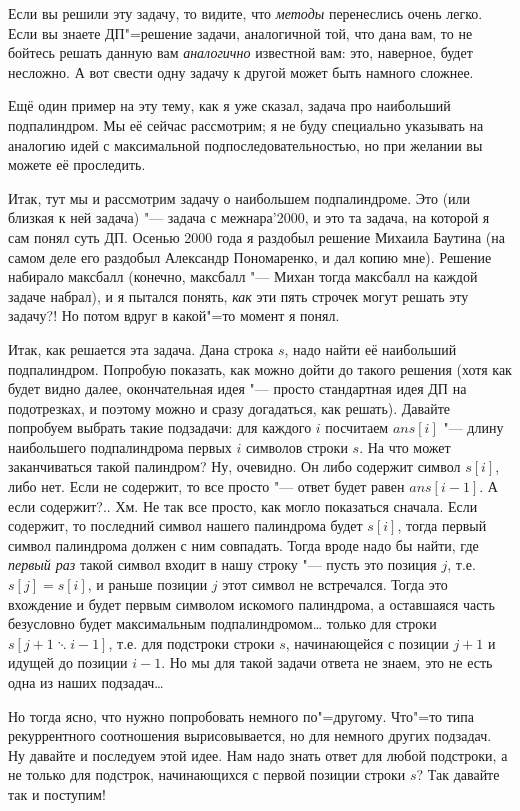 Если вы решили эту задачу, то видите, что \textit{методы} перенеслись очень легко. Если вы знаете 
ДП"=решение задачи, аналогичной той, что дана вам, то не бойтесь решать данную вам 
\textit{аналогично} известной вам: это, наверное, будет несложно. А вот свести одну задачу к другой 
может быть намного сложнее.

Ещё один пример на эту тему, как я уже сказал, задача про наибольший подпалиндром. Мы её сейчас 
рассмотрим; я не буду специально указывать на аналогию идей с максимальной подпоследовательностью, но 
при желании вы можете её проследить.

\label{subsequence}
Итак, тут мы и рассмотрим задачу о наибольшем подпалиндроме. Это (или близкая к ней задача) "--- задача с межнара'2000, и это 
та задача, на которой я сам понял суть ДП. Осенью 2000 года я раздобыл решение Михаила Баутина (на
самом деле его раздобыл Александр Пономаренко, и дал копию мне).
Решение набирало максбалл (конечно, максбалл "--- Михан тогда максбалл на каждой задаче набрал), и я пытался 
понять, \textit{как} эти пять строчек могут решать эту задачу?! Но потом вдруг в какой"=то момент я 
понял.

Итак, как решается эта задача. Дана строка $s$, надо найти её наибольший подпалиндром. Попробую 
показать, как можно дойти до такого решения (хотя как будет видно далее, окончательная идея "--- 
просто стандартная идея ДП на подотрезках, и поэтому можно и сразу догадаться, как решать). Давайте 
попробуем выбрать такие подзадачи: для каждого $i$ посчитаем $ans[i]$ "--- длину наибольшего 
подпалиндрома первых $i$ символов строки $s$. На что может заканчиваться такой палиндром? Ну, 
очевидно. Он либо содержит символ $s[i]$, либо нет. Если не содержит, то все просто "--- ответ 
будет равен $ans[i-1]$. А если содержит?.. Хм. Не так все просто, как могло показаться сначала. 
Если содержит, то последний символ нашего палиндрома будет $s[i]$, тогда первый символ палиндрома 
должен с ним совпадать. Тогда вроде надо бы найти, где \textit{первый раз} такой символ входит в 
нашу строку "--- пусть это позиция $j$, т.е. $s[j]=s[i]$, и раньше позиции $j$ этот символ не 
встречался. Тогда это вхождение и будет первым символом искомого палиндрома, а оставшаяся часть 
безусловно будет максимальным подпалиндромом\dots{} только для строки $s[j+1\ddots i-1]$, т.е. для 
подстроки строки $s$, начинающейся с позиции $j+1$ и идущей до позиции $i-1$. Но мы для такой 
задачи ответа не знаем, это не есть одна из наших подзадач\dots

Но тогда ясно, что нужно попробовать немного по"=другому. Что"=то типа рекуррентного соотношения 
вырисовывается, но для немного других подзадач. Ну давайте и последуем этой идее. Нам надо знать 
ответ для любой подстроки, а не только для подстрок, начинающихся с первой позиции строки $s$? Так 
давайте так и поступим!

